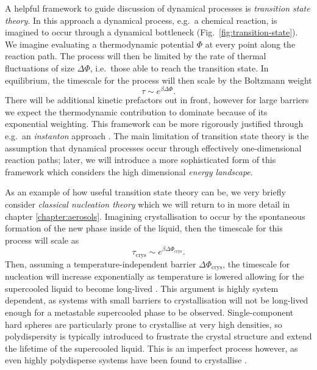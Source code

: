 A helpful framework to guide discussion of dynamical processes is \emph{transition state theory}.
In this approach a dynamical process, e.g.\ a chemical reaction, is imagined to occur through a dynamical bottleneck (Fig.\ \ref{fig:transition-state}).
We imagine evaluating a thermodynamic potential%
$\Phi$ at every point along the reaction path.
The process will then be limited by the rate of thermal fluctuations of size $\Delta \Phi$, i.e.\ those able to reach the transition state.
In equilibrium, the timescale for the process will then scale by the Boltzmann weight
\begin{equation}\label{eq:reaction-time}
  \tau \sim e^{\beta \Delta \Phi}.
\end{equation}
There will be additional kinetic prefactors out in front, however for large barriers we expect the thermodynamic contribution to dominate because of its exponential weighting.
This framework can be more rigorously justified through e.g.\ an \emph{instanton} approach \cite{LangerAP1969}.
The main limitation of transition state theory is the assumption that dynamical processes occur through effectively one-dimensional reaction paths; later, we will introduce a more sophisticated form of this framework which considers the high dimensional \emph{energy landscape}.

As an example of how useful transition state theory can be, we very briefly consider \emph{classical nucleation theory} which we will return to in more detail in chapter \ref{chapter:aerosols}.
Imagining crystallisation to occur by the spontaneous formation of the new phase inside of the liquid, then the timescale for this process will scale as
\begin{equation*}
  \tau_\mathrm{crys} \sim e^{ \beta \Delta \Phi_\mathrm{crys}}.
\end{equation*}
Then, assuming a temperature-independent barrier $\Delta \Phi_\mathrm{crys}$, the timescale for nucleation will increase exponentially as temperature is lowered allowing for the supercooled liquid to become long-lived \cite{CavagnaPR2009}.
This argument is highly system dependent, as systems with small barriers to crystallisation will not be long-lived enough for a metastable supercooled phase to be observed.
Single-component hard spheres are particularly prone to crystallise at very high densities, so polydispersity is typically introduced to frustrate the crystal structure and extend the lifetime of the supercooled liquid.
This is an imperfect process however, as even highly polydisperse systems have been found to crystallise \cite{BommineniPRL2019,BerthierPRL2016}.

